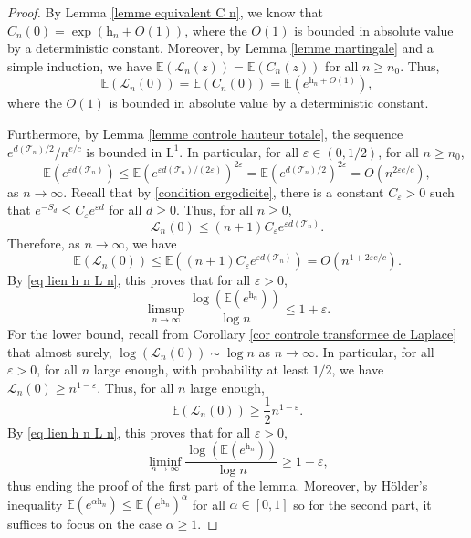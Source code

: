 \documentclass[11pt]{article}
\numberwithin{equation}{section}
\def\vp{\varepsilon}
\def \T{\mathcal{T}}
\def \cL{\mathcal{L}}
\def\E{\mathbb{E}}
\begin{document}
\begin{proof}
	By Lemma \ref{lemme equivalent C n}, we know that $C_n(0) = \exp (\mathrm{h}_n + O(1))$, where the $O(1)$ is bounded in absolute value by a deterministic constant. Moreover, by Lemma \ref{lemme martingale} and a simple induction, we have $\E(\cL_n(z)) = \E(C_n(z))$ for all $n\ge n_0$. Thus,
	\begin{equation}\label{eq lien h n L n}
	\E\left(\cL_n(0)\right) = \E\left( C_n(0) \right) = \E\left(e^{\mathrm{h}_n+ O(1)}\right),
	\end{equation}
	where the $O(1)$ is bounded in absolute value by a deterministic constant.
	
	Furthermore, by Lemma \ref{lemme controle hauteur totale}, the sequence $e^{d(\T_n)/2}/n^{e/c}$ is bounded in $\mathrm{L}^1$. In particular, for all $\vp\in (0,1/2)$, for all $n\ge n_0$,
	\begin{equation}\label{eq majoration moment exponentiel depth}
	\E\left( e^{\vp d(\T_n)} \right) \le \E\left( e^{\vp d(\T_n)/(2\vp)} \right)^{2\vp} = \E\left(e^{d(\T_n)/2}\right)^{2\vp} = O\left( n^{2\vp e/c} \right),
	\end{equation}
	as $n\to \infty$. Recall that by \eqref{condition ergodicite}, there is a constant $C_\vp>0$ such that $e^{-S_d}\le C_\vp e^{\vp d}$ for all $d \ge 0$. Thus, for all $n\ge 0$,
	\begin{equation}\label{eq majoration L n}
		\cL_n(0) \le (n+1) C_\vp e^{\vp d(\T_n)}.
	\end{equation}
	Therefore, as $n\to \infty$, we have
	\[
	\E\left(\cL_n(0)\right)\le \E\left((n+1) C_\vp e^{\vp d(\T_n)} \right) = O\left(n^{1+2\vp e/c}\right).
	\]
	By \eqref{eq lien h n L n}, this proves that for all $\vp>0$,
	\[
	\limsup_{n\to \infty} \frac{\log(\E(e^{\mathrm{h}_n}))}{\log n} \le 1+ \vp.
	\]
	For the lower bound, recall from Corollary \ref{cor controle transformee de Laplace} that almost surely, $ \log (\cL_n(0)) \sim \log n$ as $n\to \infty$. In particular, for all $\vp>0$, for all $n$ large enough, with probability at least $1/2$, we have $\cL_n(0) \ge n^{1-\vp}$. Thus, for all $n$ large enough,
	\[
	\E\left(\cL_n(0)\right) \ge \frac{1}{2} n^{1-\vp}.
	\]
	By \eqref{eq lien h n L n}, this proves that for all $\vp>0$,
	\[
	\liminf_{n\to \infty} \frac{\log(\E(e^{\mathrm{h}_n}))}{\log n} \ge 1-\vp,
	\]
	thus ending the proof of the first part of the lemma. Moreover, by Hölder's inequality $\E(e^{\alpha\mathrm{h}_n}) \le \E(e^{\mathrm{h}_n})^\alpha$ for all $\alpha \in [0,1]$ so for the second part, it suffices to focus on the case $\alpha\ge 1$.
	

\end{proof}
\end{document}

